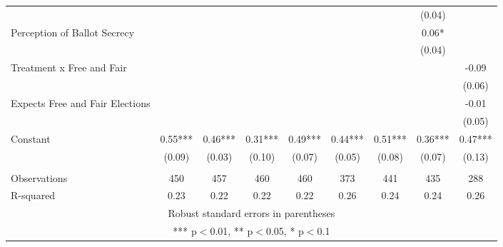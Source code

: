 \begin{tabular}{lcccccccc}
 &  &  &  &  &  &  & (0.04) &  \\
Perception of Ballot Secrecy &  &  &  &  &  &  & 0.06* &  \\
 &  &  &  &  &  &  & (0.04) &  \\
Treatment x Free and Fair &  &  &  &  &  &  &  & -0.09 \\
 &  &  &  &  &  &  &  & (0.06) \\
Expects Free and Fair Elections &  &  &  &  &  &  &  & -0.01 \\
 &  &  &  &  &  &  &  & (0.05) \\
Constant & 0.55*** & 0.46*** & 0.31*** & 0.49*** & 0.44*** & 0.51*** & 0.36*** & 0.47*** \\
 & (0.09) & (0.03) & (0.10) & (0.07) & (0.05) & (0.08) & (0.07) & (0.13) \\
 &  &  &  &  &  &  &  &  \\
Observations & 450 & 457 & 460 & 460 & 373 & 441 & 435 & 288 \\
 R-squared & 0.23 & 0.22 & 0.22 & 0.22 & 0.26 & 0.24 & 0.24 & 0.26 \\ \hline
\multicolumn{9}{c}{ Robust standard errors in parentheses} \\
\multicolumn{9}{c}{ *** p$<$0.01, ** p$<$0.05, * p$<$0.1} \\
\end{tabular}
